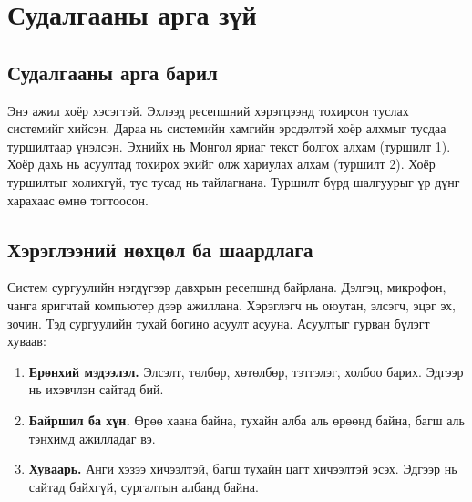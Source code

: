 \chapter{Судалгааны арга зүй}
\label{ch:method}


\section{Судалгааны арга барил}
\label{sec:approach}

Энэ ажил хоёр хэсэгтэй. Эхлээд ресепшний хэрэгцээнд тохирсон туслах системийг хийсэн. Дараа нь системийн хамгийн эрсдэлтэй хоёр алхмыг тусдаа туршилтаар үнэлсэн. Эхнийх нь Монгол яриаг текст болгох алхам (туршилт 1). Хоёр дахь нь асуултад тохирох эхийг олж хариулах алхам (туршилт 2). Хоёр туршилтыг холихгүй, тус тусад нь тайлагнана. Туршилт бүрд шалгуурыг үр дүнг харахаас өмнө тогтоосон.

\section{Хэрэглээний нөхцөл ба шаардлага}
\label{sec:requirements}

Систем сургуулийн нэгдүгээр давхрын ресепшнд байрлана. Дэлгэц, микрофон, чанга яригчтай компьютер дээр ажиллана. Хэрэглэгч нь оюутан, элсэгч, эцэг эх, зочин. Тэд сургуулийн тухай богино асуулт асууна. Асуултыг гурван бүлэгт хуваав:
\begin{enumerate}
    \item \textbf{Ерөнхий мэдээлэл.} Элсэлт, төлбөр, хөтөлбөр, тэтгэлэг, холбоо барих. Эдгээр нь ихэвчлэн сайтад бий.
    \item \textbf{Байршил ба хүн.} Өрөө хаана байна, тухайн алба аль өрөөнд байна, багш аль тэнхимд ажилладаг вэ.
    \item \textbf{Хуваарь.} Анги хэзээ хичээлтэй, багш тухайн цагт хичээлтэй эсэх. Эдгээр нь сайтад байхгүй, сургалтын албанд байна.
\end{enumerate}

